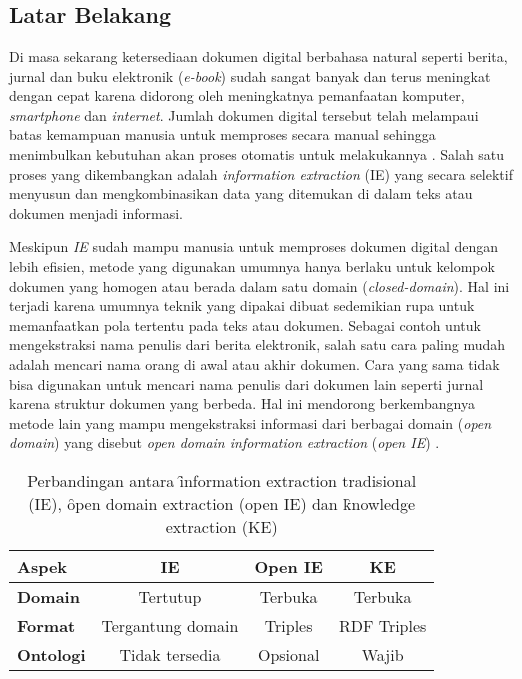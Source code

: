 \chapter{\babSatu}

\section{Latar Belakang}
Di masa sekarang ketersediaan dokumen digital berbahasa natural seperti berita, jurnal dan buku elektronik (\textit{e-book}) sudah sangat banyak dan terus meningkat dengan cepat karena didorong oleh meningkatnya pemanfaatan komputer, \textit{smartphone} dan \textit{internet}. Jumlah dokumen digital tersebut telah melampaui batas kemampuan manusia untuk memproses secara manual sehingga menimbulkan kebutuhan akan proses otomatis untuk melakukannya \citep{banko2007open}. Salah satu proses yang dikembangkan adalah \textit{information extraction} (IE) yang secara selektif menyusun dan mengkombinasikan data yang ditemukan di dalam teks atau dokumen menjadi informasi\citep{cowie1996information}.

Meskipun \textit{IE} sudah mampu manusia untuk memproses dokumen digital dengan lebih efisien, metode yang digunakan umumnya hanya berlaku untuk kelompok dokumen yang homogen atau berada dalam satu domain (\textit{closed-domain}). Hal ini terjadi karena umumnya teknik yang dipakai dibuat sedemikian rupa untuk memanfaatkan pola tertentu pada teks atau dokumen\citep{cowie1996information}. Sebagai contoh untuk mengekstraksi nama penulis dari berita elektronik, salah satu cara paling mudah adalah mencari nama orang di awal atau akhir dokumen. Cara yang sama tidak bisa digunakan untuk mencari nama penulis dari dokumen lain seperti jurnal karena struktur dokumen yang berbeda. Hal ini mendorong berkembangnya metode lain yang mampu mengekstraksi informasi dari berbagai domain (\textit{open domain}) yang disebut \textit{open domain information extraction} (\textit{open IE}) \citep{banko2007open}.

\begin{table}
	\centering
	\caption{Perbandingan antara \f{information extraction} tradisional (IE), \f{open domain extraction} (open IE) dan \f{knowledge extraction} (KE)}
	\label{table_paradigm_comparison}
	\begin{tabular}{l c c c}
		\hline 
		\textbf{Aspek} & \textbf{IE} & \textbf{Open IE} & \textbf{KE} \\ 
		\hline 
		\textbf{Domain} & Tertutup & Terbuka & Terbuka \\ 
		\textbf{Format} & Tergantung domain & Triples & RDF Triples \\ 
		\textbf{Ontologi} & Tidak tersedia & Opsional & Wajib \\ 
		\hline 
	\end{tabular} 
\end{table}

